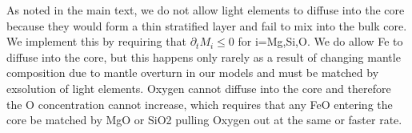 \documentclass[]{article}
\begin{document}
	As noted in the main text, we do not allow light elements to diffuse into the core because they would form a thin stratified layer and fail to mix into the bulk core. We implement this by requiring that \(\partial_t M_i \le 0\) for i=Mg,Si,O. We do allow Fe to diffuse into the core, but this happens only rarely as a result of changing mantle composition due to mantle overturn in our models and must be matched by exsolution of light elements. Oxygen cannot diffuse into the core and therefore the O concentration cannot increase, which requires that any FeO entering the core be matched by MgO or SiO2 pulling Oxygen out at the same or faster rate.
	
		
\end{document}
